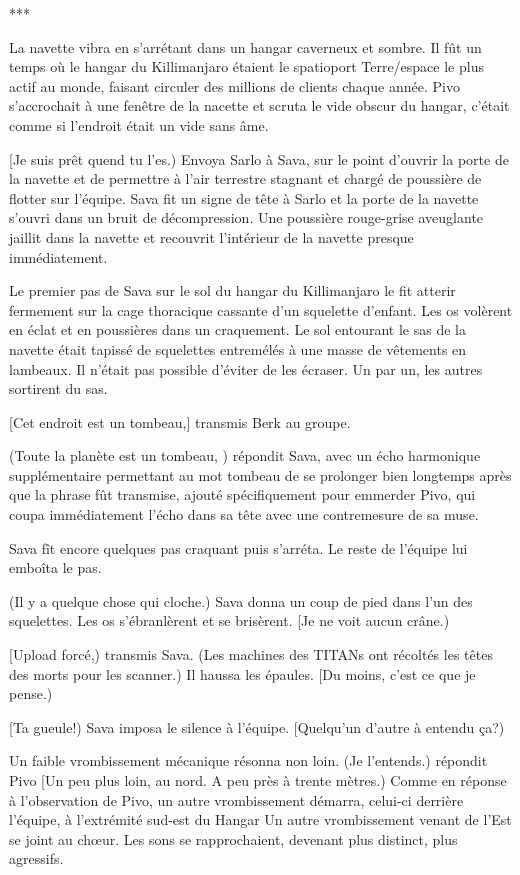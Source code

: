 \begin{center} *** \end{center} 

La navette vibra en s'arrétant dans un hangar caverneux et sombre. Il fût un temps où le hangar du Killimanjaro étaient le spatioport Terre/espace le plus actif au monde, faisant circuler des millions de clients chaque année. Pivo s'accrochait à une fenêtre de la nacette et scruta le vide obscur du hangar, c'était comme si l'endroit était un vide sans âme. 

[Je suis prêt quend tu l'es.) Envoya Sarlo à Sava, sur le point d'ouvrir la porte de la navette et de permettre à l'air terrestre stagnant et chargé de poussière de flotter sur l'équipe. Sava fit un signe de tête à Sarlo et la porte de la navette s'ouvri dans un bruit de décompression. Une poussière rouge-grise aveuglante jaillit dans la navette et recouvrit l'intérieur de la navette presque immédiatement. 

Le premier pas de Sava sur le sol du hangar du Killimanjaro le fit atterir fermement sur la cage thoracique cassante d'un squelette d'enfant. Les os volèrent en éclat et en poussières dans un craquement. Le sol entourant le sas de la navette était tapissé de squelettes entremélés à une masse de vêtements en lambeaux. Il n'était pas possible d'éviter de les écraser. Un par un, les autres sortirent du sas. 

[Cet endroit est un tombeau,] transmis Berk au groupe. 

(Toute la planète est un tombeau, ) répondit Sava, avec un écho harmonique supplémentaire permettant au mot tombeau de se prolonger  bien longtemps après que la phrase fût transmise, ajouté spécifiquement pour emmerder Pivo, qui coupa immédiatement l'écho dans sa tête avec une contremesure de sa muse. 

Sava fît encore quelques pas craquant puis s'arréta. Le reste de l'équipe lui emboîta le pas. 

(Il y a quelque chose qui cloche.) Sava donna un coup de pied dans l'un des squelettes. Les os s'ébranlèrent et se brisèrent. [Je ne voit aucun crâne.) 

[Upload forcé,) transmis Sava. (Les machines des TITANs ont récoltés les têtes des morts pour les scanner.) Il haussa les épaules. [Du moins, c'est ce que je pense.) 

[Ta gueule!) Sava imposa le silence à l'équipe. [Quelqu'un d'autre à entendu ça?) 

Un faible vrombissement mécanique résonna non loin. (Je l'entends.) répondit Pivo [Un peu plus loin, au nord. A peu près à trente mètres.) Comme en réponse à l'observation de Pivo, un autre vrombissement démarra, celui-ci derrière l'équipe, à l'extrémité sud-est du Hangar Un autre vrombissement venant de l'Est se joint au chœur. Les sons se rapprochaient, devenant plus distinct, plus agressifs. 

